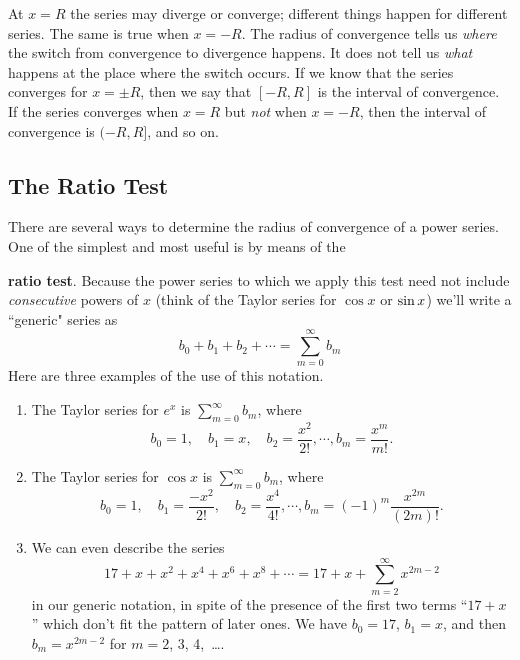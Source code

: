 At $x = R$ the series may diverge or converge; different things happen
for different series.  The same is true when $x = -R$.  The radius of
convergence tells us {\em where\/} the switch from convergence to
divergence happens.  It does not tell us {\em what\/} happens at the
place where the switch occurs.  If we know that the series converges
for $x=\pm R$, then we say that $[-R,R]$ is the interval of
convergence.  If the series converges when $x=R$ but {\em not\/} when
$x=-R$, then the interval of convergence is $(-R,R]$, and so on.


\subsection{The Ratio Test}
\label{subsec:the-ratio-test}

There are several ways to determine the radius of convergence of a
power series.  One of the simplest and most useful is by means of the

{\bf ratio test}. Because the power series to which
we apply this test need not include {\em consecutive} powers of $x$
(think of the Taylor series for $\cos x$ or $\sin x\/$) we'll write a
``generic" series as
\[
b_0 + b_1 + b_2 + \cdots = \sum_{m=0}^\infty b_m
\] 
Here are three examples of the use of this notation.

\begin{enumerate}

\item  The Taylor series for $e^x$ is ${\displaystyle \sum_{m=0}^\infty
  b_m}$, where
\[
b_0 = 1, \quad  b_1 = x, \quad b_2 = \dfrac{x^2}{2!}, \cdots , 
   b_m = \dfrac{x^m}{m!}.
\]

\item  The Taylor series for $\cos x$ is ${\displaystyle
  \sum_{m=0}^\infty b_m}$, where
\[
b_0 = 1, \quad b_1 = \dfrac{-x^2}{2!}, \quad b_2 = \dfrac{x^4}{4!}, 
    \cdots , b_m = (-1)^m \dfrac{x^{2m}}{(2m)!} .
\]

\item  We can even describe the series
\[
17 + x + x^2 + x^4 + x^6 + x^8 + \cdots = 17 + x + \sum_{m=2}^\infty x^{2m-2}
\]
in our generic notation, in spite of the presence of the first two
terms ``$17 + x$'' which don't fit the pattern of later ones.  We have
$b_0 = 17$, $b_1 = x$, and then $b_m = x^{2m-2}$ for $m = 2$, 3,
4,~\ldots .  

\end{enumerate}



